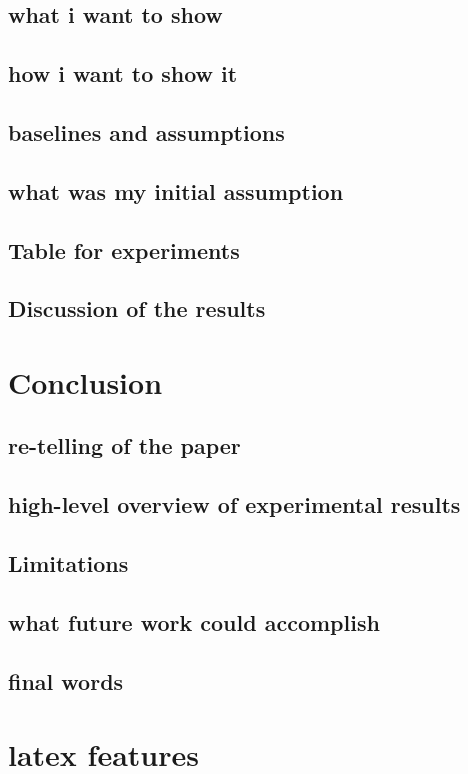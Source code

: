 \documentclass[a4paper,11pt,oneside]{memoir}
\begin{document}
\section{what i want to show}
\section{how i want to show it}
\section{baselines and assumptions}
\section{what was my initial assumption}
\section{Table for experiments}
\section{Discussion of the results}

\chapter{Conclusion}
\section{re-telling of the paper}
\section{high-level overview of experimental results}
\section{Limitations}
\section{what future work could accomplish}
\section{final words}
		
\newpage
			
\chapter{latex features}
\\ \noindent{}\\\\\\
\end{document}
